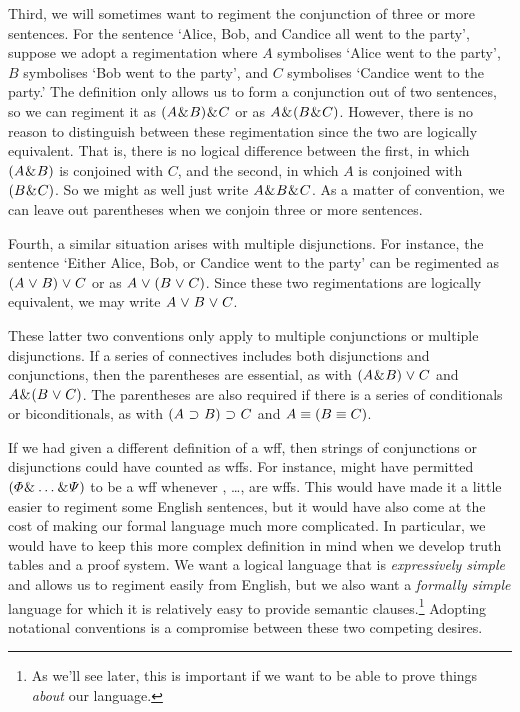 Third, we will sometimes want to regiment the conjunction of three or more sentences.
For the sentence `Alice, Bob, and Candice all went to the party', suppose we adopt a regimentation where $A$ symbolises `Alice went to the party', $B$ symbolises `Bob went to the party', and $C$ symbolises `Candice went to the party.'
The definition only allows us to form a conjunction out of two sentences, so we can regiment it as $(A \mkern1mu\&\mkern1mu B) \mkern1mu\&\mkern1mu C$ or as $A \mkern1mu\&\mkern1mu (B \mkern1mu\&\mkern1mu C)$.
However, there is no reason to distinguish between these regimentation since the two are logically equivalent.
That is, there is no logical difference between the first, in which $(A \mkern1mu\&\mkern1mu B)$ is conjoined with $C$, and the second, in which $A$ is conjoined with $(B \mkern1mu\&\mkern1mu C)$.
So we might as well just write $A \mkern1mu\&\mkern1mu B \mkern1mu\&\mkern1mu C$.
As a matter of convention, we can leave out parentheses when we conjoin three or more sentences.

Fourth, a similar situation arises with multiple disjunctions.
For instance, the sentence `Either Alice, Bob, or Candice went to the party' can be regimented as $(A \mkern1mu\vee\mkern1mu B) \mkern1mu\vee\mkern1mu C$ or as $A \mkern1mu\vee\mkern1mu (B \mkern1mu\vee\mkern1mu C)$.
Since these two regimentations are logically equivalent, we may write $A \mkern1mu\vee\mkern1mu B \mkern1mu\vee\mkern1mu C$.

These latter two conventions only apply to multiple conjunctions or multiple  disjunctions.
If a series of connectives includes both disjunctions and conjunctions, then the parentheses are essential, as with $(A \mkern1mu\&\mkern1mu B) \mkern1mu\vee\mkern1mu C$ and $A \mkern1mu\&\mkern1mu (B \mkern1mu\vee\mkern1mu C)$.
The parentheses are also required if there is a series of conditionals or biconditionals, as with $(A \mkern1mu\supset\mkern1mu B) \mkern1mu\supset\mkern1mu C$ and $A \equiv (B \equiv C)$.

If we had given a different definition of a wff, then strings of conjunctions or disjunctions could have counted as wffs.
For instance, might have permitted $(\varPhi{} \mkern1mu\&\mkern1mu \ldots \mkern1mu\&\mkern1mu \varPsi{})$ to be a wff whenever \metaA{}, \ldots, \metaB{} are wffs.
This would have made it a little easier to regiment some English sentences, but it would have also come at the cost of making our formal language much more complicated.
In particular, we would have to keep this more complex definition in mind when we develop truth tables and a proof system.
We want a logical language that is \emph{expressively simple} and allows us to regiment easily from English, but we also want a \emph{formally simple} language for which it is relatively easy to provide semantic clauses.\footnote{As we'll see later, this is important if we want to be able to prove things \emph{about} our language.}
Adopting notational conventions is a compromise between these two competing desires.


